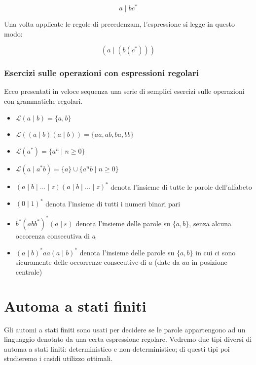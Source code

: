 \documentclass[class=book, crop=false, oneside, 12pt]{standalone}
\begin{document}
\begin{equation*}
    a \mid b c^\ast
\end{equation*}

\noindent Una volta applicate le regole di precedenzam, l'espressione si legge in questo modo:

\begin{equation*}
    (a \mid ( b  ( c^\ast ) ) )
\end{equation*}    

\subsubsection{Esercizi sulle operazioni con espressioni regolari}
Ecco presentati in veloce sequenza una serie di semplici esercizi sulle operazioni con grammatiche regolari. 

\begin{itemize}
    \item \(\mathcal{L}(a \mid b) = \{a, b\}\)
    \item \(\mathcal{L}((a \mid b) (a \mid b)) = \{aa, ab, ba, bb\}\)
    \item \(\mathcal{L}(a^*) = \{a^n \mid n \ge 0\}\)
    \item \(\mathcal{L}(a \mid a^\ast b) = \{a\} \cup \{a^n b \mid n \ge 0\}\)
    \item \( (a \mid b \mid \ldots \mid z)(a \mid b \mid \ldots \mid z)^\ast \) denota l’insieme di tutte le parole dell’alfabeto
    \item \( (0 \mid 1)^\ast \) denota l’insieme di tutti i numeri binari pari
    \item \( b^\ast (abb^\ast )^\ast ( a \mid \varepsilon ) \) denota l’insieme delle parole su \(\{a,b\} \), senza alcuna occorenza consecutiva di \(a\)
    \item \( (a \mid b)^\ast aa(a \mid b)^\ast \) denota l’insieme delle parole su \( \{a,b\} \) in cui ci sono sicuramente delle occorrenze consecutive di \(a\) (date da \(aa\) in posizione centrale)
\end{itemize}

\section{Automa a stati finiti}
Gli automi a stati finiti sono usati per decidere se le parole appartengono ad un linguaggio denotato da una certa espressione regolare.
Vedremo due tipi diversi di automa a stati finiti: deterministico e non deterministico; di questi tipi poi studieremo i casidi utilizzo ottimali.
\end{document}
